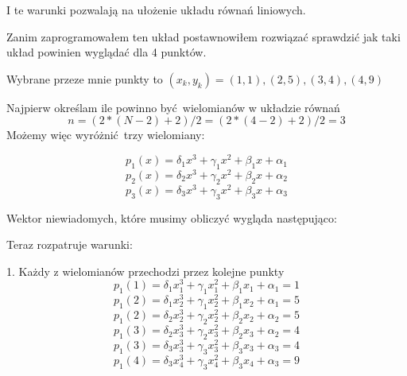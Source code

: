 \documentclass[varwidth,12pt,a4paper]{article}
\begin{document}
I te warunki pozwalają na ułożenie układu równań liniowych.

Zanim zaprogramowałem ten układ postawnowiłem rozwiązać sprawdzić jak taki układ powinien wyglądać dla 4 punktów.

Wybrane przeze mnie punkty to $(x_k, y_k)  = (1,1), (2,5), (3,4), (4, 9) $

Najpierw określam ile powinno być wielomianów w układzie równań 
\begin{equation}
n=(2*(N-2)+2)/2 = (2*(4-2)+2)/2 = 3 
\end{equation}
Możemy więc wyróżnić trzy wielomiany:

\begin{equation}
    p_1(x) = \delta _1 x^3 + \gamma _1 x^2 + \beta _1 x + \alpha _1
\end{equation}
\begin{equation}
    p_2(x) = \delta _2 x^3 + \gamma _2 x^2 + \beta _2 x + \alpha _2
\end{equation}
\begin{equation}
    p_3(x) = \delta _3 x^3 + \gamma _3 x^2 + \beta _3 x + \alpha _3
\end{equation}

Wektor niewiadomych, które musimy obliczyć wygląda następująco:
\begin{equation}
    [\delta _1, \delta_2, \delta_3, \gamma _1, \gamma _2, \gamma_3, \beta _1, \beta _2, \beta _3, \alpha _1, \alpha _2, \alpha _3 ]
\end{equation}


Teraz rozpatruje warunki:

1. Każdy z wielomianów przechodzi przez kolejne punkty
\begin{equation}
    p_1(1) = \delta _1 x_1^3 + \gamma _1 x_1^2 + \beta _1 x_1 + \alpha _1 = 1
\end{equation}
\begin{equation}
    p_1(2) = \delta _1 x_2^3 + \gamma _1 x_2^2 + \beta _1 x_2 + \alpha _1 = 5
\end{equation}
\begin{equation}
    p_1(2) = \delta _2 x_2^3 + \gamma _2 x_2^2 + \beta _2 x_2 + \alpha _2 = 5
\end{equation}
\begin{equation}
    p_1(3) = \delta _2 x_3^3 + \gamma _2 x_3^2 + \beta _2 x_3 + \alpha _2 = 4
\end{equation}
\begin{equation}
    p_1(3) = \delta _3 x_3^3 + \gamma _3 x_3^2 + \beta _3 x_3 + \alpha _3 = 4
\end{equation}
\begin{equation}
    p_1(4) = \delta _3 x_4^3 + \gamma _3 x_4^2 + \beta _3 x_4 + \alpha _3 = 9
\end{equation}
\end{document}
